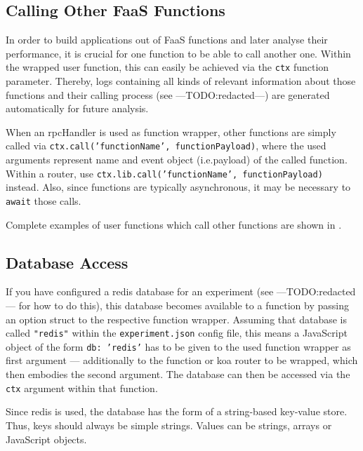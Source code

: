 \documentclass[../main.tex]{subfiles}
\begin{document}
\subsection{Calling Other FaaS Functions}\label{sub:functionCallingOther}

In order to build applications out of FaaS functions and later analyse their performance,
it is crucial for one function to be able to call another one.
Within the wrapped user function, this can easily be achieved via the \texttt{ctx} function parameter.
Thereby, logs containing all kinds of relevant information about those functions and their calling process (see ---TODO:\@ redacted---)
are generated automatically for future analysis.

When an rpcHandler is used as function wrapper, other functions are simply called via
\texttt{ctx.call('functionName', functionPayload)},
where the used arguments represent name and event object (i.e.\@ payload) of the called function.
Within a router, use \texttt{ctx.lib.call('functionName', functionPayload)} instead.
Also, since functions are typically asynchronous, it may be necessary to \texttt{await} those calls.

Complete examples of user functions which call other functions are shown in 
.

\subsection{Database Access}\label{sub:functionDBAccess}

If you have configured a redis database for an experiment (see ---TODO:\@ redacted--- for how to do this),
this database becomes available to a function by passing an option struct to the respective function wrapper.
Assuming that database is called \texttt{"redis"} within the \texttt{experiment.json} config file,
this means a JavaScript object of the form \texttt{{db: 'redis'}} has to be given to the used function wrapper
as first argument --- additionally to the function or koa router to be wrapped, which then embodies the second argument.
The database can then be accessed via the \texttt{ctx} argument within that function.

Since redis is used, the database has the form of a string-based key-value store. 
Thus, keys should always be simple strings. 
Values can be strings, arrays or JavaScript objects. 
\end{document}

